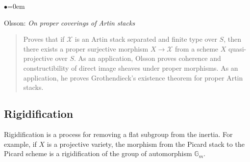 \begin{list}{$\bullet$}{\leftmargin=0em}
\item Olsson: \emph{On proper coverings of Artin stacks} \cite{olsson_proper}
\begin{quote}
Proves that if $\mathcal{X}$ is an Artin stack separated
and finite type over $S$, then 
there exists a proper surjective morphism $X \to \mathcal{X}$ from a scheme $X$ 
quasi-projective over $S$. As an application, Olsson proves coherence and 
constructibility of direct image sheaves under proper morphisms. As an
application, he proves Grothendieck's existence theorem for proper
Artin stacks. 
\end{quote}
\end{list}


\subsection{Rigidification}
\label{subsection-rigidification}

\noindent
Rigidification is a process for removing a flat subgroup from the inertia.
For example, if $X$ is a projective variety, the morphism from the Picard
stack to the Picard scheme is a rigidification of the group of automorphism
$\mathbb{G}_m$.  

\smallskip

